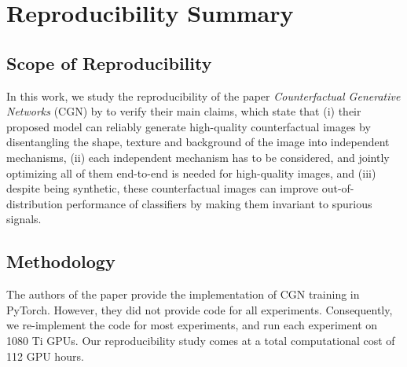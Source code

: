 \section*{Reproducibility Summary}


\subsection*{Scope of Reproducibility}
In this work, we study the reproducibility of the paper \emph{Counterfactual Generative Networks} (CGN) by \citeauthor{Sauer2021ICLR} to verify their main claims, which state that
(i) their proposed model can reliably generate high-quality counterfactual images by disentangling the shape, texture and background of the image into independent mechanisms,
(ii) each independent mechanism has to be considered, and jointly optimizing all of them end-to-end is needed for high-quality images, and
(iii) despite being synthetic, these counterfactual images can improve out-of-distribution performance of classifiers by making them invariant to spurious signals.

\subsection*{Methodology}
The authors of the paper provide the implementation of CGN training in PyTorch. However, they did not provide code for all experiments. Consequently, we re-implement the code for most experiments, and run each experiment on 1080 Ti GPUs. Our reproducibility study comes at a total computational cost of 112 GPU hours.

